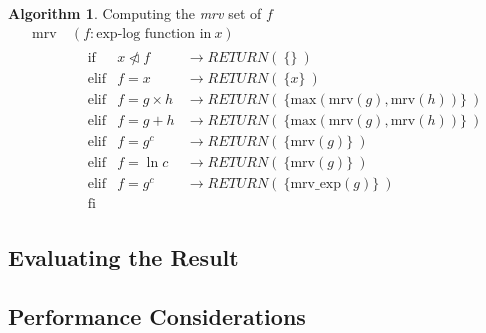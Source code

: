 \documentclass{article}
\theoremstyle{plain}
\theoremstyle{definition}
\theoremstyle{algorithm}
\newtheorem*{algo*}{Algorithm}
\begin{document}
	\begin{algo*}
		Computing the \textit{mrv} set of \(f\) \\
		\[
		\begin{aligned}
			\text{mrv}\:&(f : \text{exp-log function in} \: x) \\
			&\begin{aligned}
				&\text{if} &x \ntriangleleft f & \rightarrow RETURN(\:\{\}\:) \\
				&\text{elif} &f = x & \rightarrow RETURN(\:\{x\}\:) \\
				&\text{elif} &f = g \times h & \rightarrow RETURN(\:\{\text{max}(\text{mrv}(g), \text{mrv}(h))\}\:) \\
				&\text{elif} &f = g + h & \rightarrow RETURN(\:\{\text{max}(\text{mrv}(g), \text{mrv}(h))\}\:) \\
				&\text{elif} &f = g^{c} & \rightarrow RETURN(\:\{\text{mrv}(g)\}\:) \\
				&\text{elif} &f = \ln{c} & \rightarrow RETURN(\:\{\text{mrv}(g)\}\:) \\
				&\text{elif} &f = g^{c} & \rightarrow RETURN(\:\{\text{mrv\_exp}(g)\}\:) \\
				&\text{fi}
			\end{aligned}
		\end{aligned}
		\]
	\end{algo*}

	
	
	
	\subsection{Evaluating the Result}
	
	\subsection{Performance Considerations}
	
\end{document}
